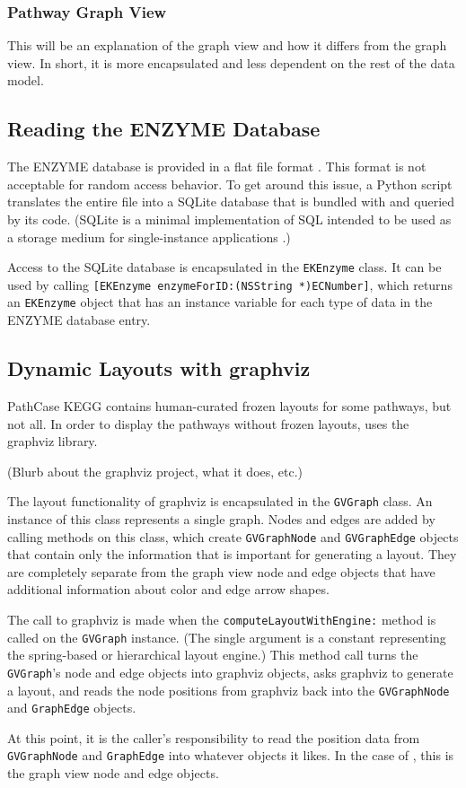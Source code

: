 \subsubsection{Pathway Graph View}
\label{sect:kegg_impl_graph_view}

This will be an explanation of the \keggapp graph view and how it differs from
the \mawapp graph view. In short, it is more encapsulated and less dependent on
the rest of the data model.

\subsection{Reading the ENZYME Database}
\label{sect:kegg_impl_enzyme}

The ENZYME database is provided in a flat file format \cite{enzyme:enzuser}. This
format is not acceptable for random access behavior. To get around this issue, a
Python script translates the entire file into a SQLite database that is bundled
with \keggapp and queried by its code. (SQLite is a minimal implementation
of SQL intended to be used as a storage medium for single-instance applications
\cite{sqlite:main}.)

Access to the SQLite database is encapsulated in the \texttt{EKEnzyme} class. It
can be used by calling \texttt{[EKEnzyme enzymeForID:(NSString *)ECNumber]},
which returns an \texttt{EKEnzyme} object that has an instance variable for each
type of data in the ENZYME database entry.

\subsection{Dynamic Layouts with graphviz}
\label{sect:kegg_impl_graphviz}

PathCase KEGG contains human-curated frozen layouts for some pathways, but not
all. In order to display the pathways without frozen layouts, \keggapp
uses the graphviz library.

(Blurb about the graphviz project, what it does, etc.)

The layout functionality of graphviz is encapsulated in the \texttt{GVGraph}
class. An instance of this class represents a single graph. Nodes and edges are
added by calling methods on this class, which create \texttt{GVGraphNode} and
\texttt{GVGraphEdge} objects that contain only the information that is important
for generating a layout. They are completely separate from the graph view node
and edge objects that have additional information about color and edge arrow
shapes.

The call to graphviz is made when the \texttt{computeLayoutWithEngine:} method
is called on the \texttt{GVGraph} instance. (The single argument is a constant
representing the spring-based or hierarchical layout engine.) This method call
turns the \texttt{GVGraph}'s node and edge objects into graphviz objects, asks
graphviz to generate a layout, and reads the node positions from graphviz back
into the \texttt{GVGraphNode} and \texttt{GraphEdge} objects.

At this point, it is the caller's responsibility to read the position data from
\texttt{GVGraphNode} and \texttt{GraphEdge} into whatever objects it likes. In
the case of \keggapp, this is the graph view node and edge objects.
